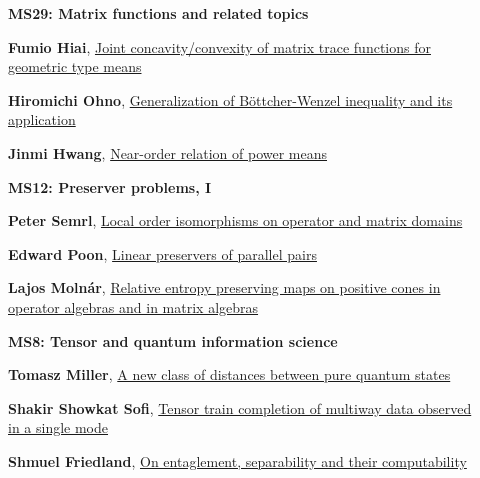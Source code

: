 \documentclass[ILAS2025-program.tex]{subfiles}
\begin{document}
\begin{description}
    \begin{description}
    \item[] {\color{mstitle}\textbf{MS29: Matrix functions and related topics}} 
    \item[] \hypertarget{up0013}{}\textbf{Fumio Hiai}, \hyperlink{down0013}{Joint concavity/convexity of matrix trace functions for geometric type means}
        \item[] \hypertarget{up0014}{}\textbf{Hiromichi Ohno}, \hyperlink{down0014}{Generalization of B\"ottcher-Wenzel inequality and its application}
        \item[] \hypertarget{up0015}{}\textbf{Jinmi Hwang}, \hyperlink{down0015}{Near-order relation of power means}
        \end{description}
    \begin{description}
    \item[] {\color{mstitle}\textbf{MS12: Preserver problems, I}} 
    \item[] \hypertarget{up0016}{}\textbf{Peter Semrl}, \hyperlink{down0016}{Local order isomorphisms on operator and matrix domains}
        \item[] \hypertarget{up0017}{}\textbf{Edward Poon}, \hyperlink{down0017}{Linear preservers of parallel pairs}
        \item[] \hypertarget{up0018}{}\textbf{Lajos Molnár}, \hyperlink{down0018}{Relative entropy preserving maps on positive cones in operator algebras and in matrix algebras}
        \end{description}
    \begin{description}
    \item[] {\color{mstitle}\textbf{MS8: Tensor and quantum information science}} 
    \item[] \hypertarget{up0019}{}\textbf{Tomasz Miller}, \hyperlink{down0019}{A new class of distances between pure quantum states}
        \item[] \hypertarget{up0020}{}\textbf{Shakir Showkat Sofi}, \hyperlink{down0020}{Tensor train completion of multiway data observed in a single mode}
        \item[] \hypertarget{up0021}{}\textbf{Shmuel Friedland}, \hyperlink{down0021}{On entaglement, separability and their computability}

\end{description}
\end{description}
\end{document}
